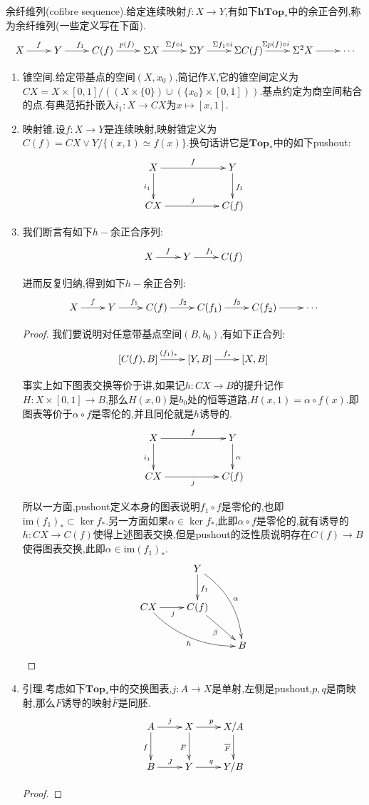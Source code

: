 余纤维列(cofibre sequence).给定连续映射$f:X\to Y$,有如下$\textbf{hTop}_*$中的余正合列,称为余纤维列(一些定义写在下面).
$$\xymatrix{X\ar[r]^f&Y\ar[r]^{f_1}&C(f)\ar[r]^{p(f)}&\Sigma X\ar[r]^{\Sigma f\circ i}&\Sigma Y\ar[r]^{\Sigma f_1\circ i}&\Sigma C(f)\ar[r]^{\Sigma p(f)\circ i}&\Sigma^2 X\ar[r]&\cdots}$$
\begin{enumerate}
	\item 锥空间.给定带基点的空间$(X,x_0)$,简记作$X$,它的锥空间定义为$CX=X\times[0,1]/((X\times\{0\})\cup(\{x_0\}\times[0,1]))$.基点约定为商空间粘合的点.有典范拓扑嵌入$i_1:X\to CX$为$x\mapsto[x,1]$.
	\item 映射锥.设$f:X\to Y$是连续映射,映射锥定义为$C(f)=CX\vee Y/\{(x,1)\simeq f(x)\}$.换句话讲它是$\textbf{Top}_*$中的如下pushout:
	$$\xymatrix{X\ar[rr]^f\ar[d]_{i_1}&&Y\ar[d]^{f_1}\\CX\ar[rr]^j&&C(f)}$$
	\item 我们断言有如下$h-$余正合序列:
	$$\xymatrix{X\ar[r]^f&Y\ar[r]^{f_1}&C(f)}$$
	
	进而反复归纳,得到如下$h-$余正合列:
	$$\xymatrix{X\ar[r]^f&Y\ar[r]^{f_1}&C(f)\ar[r]^{f_2}&C(f_1)\ar[r]^{f_3}&C(f_2)\ar[r]&\cdots}$$
	\begin{proof}
		
		我们要说明对任意带基点空间$(B,b_0)$,有如下正合列:
		$$\xymatrix{[C(f),B]\ar[r]^{(f_1)_*}&[Y,B]\ar[r]^{f_*}&[X,B]}$$
		
		事实上如下图表交换等价于讲,如果记$h:CX\to B$的提升记作$H:X\times[0,1]\to B$,那么$H(x,0)$是$b_0$处的恒等道路,$H(x,1)=\alpha\circ f(x)$.即图表等价于$\alpha\circ f$是零伦的,并且同伦就是$h$诱导的.
		$$\xymatrix{X\ar[rr]^f\ar[d]_{i_1}&&Y\ar[d]^{\alpha}\\CX\ar[rr]_j&&C(f)}$$
		
		所以一方面,pushout定义本身的图表说明$f_1\circ f$是零伦的,也即$\mathrm{im}(f_1)_*\subset\ker f_*$.另一方面如果$\alpha\in\ker f_*$,此即$\alpha\circ f$是零伦的,就有诱导的$h:CX\to C(f)$使得上述图表交换,但是pushout的泛性质说明存在$C(f)\to B$使得图表交换,此即$\alpha\in\mathrm{im}(f_1)_*$.
		$$\xymatrix{&Y\ar[d]^{f_1}\ar@/^1pc/[ddr]^{\alpha}&\\CX\ar[r]_j\ar@/_1pc/[drr]_h&C(f)\ar[dr]_{\beta}&\\&&B}$$
	\end{proof}
	\item 引理.考虑如下$\textbf{Top}_*$中的交换图表,$j:A\to X$是单射,左侧是pushout,$p,q$是商映射,那么$F$诱导的映射$\overline{F}$是同胚.
	$$\xymatrix{A\ar[r]^j\ar[d]_f&X\ar[r]^p\ar[d]_F&X/A\ar[d]_{\overline{F}}\\B\ar[r]^J&Y\ar[r]^q&Y/B}$$
	\begin{proof}
		

\end{proof}
\end{enumerate}
